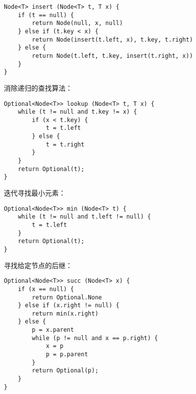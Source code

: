 \documentclass[b5paper]{ctexart}
\begin{document}
\begin{lstlisting}
Node<T> insert (Node<T> t, T x) {
    if (t == null) {
        return Node(null, x, null)
    } else if (t.key < x) {
        return Node(insert(t.left, x), t.key, t.right)
    } else {
        return Node(t.left, t.key, insert(t.right, x))
    }
}
\end{lstlisting}

消除递归的查找算法：

\begin{lstlisting}
Optional<Node<T>> lookup (Node<T> t, T x) {
    while (t != null and t.key != x) {
        if (x < t.key) {
            t = t.left
        } else {
            t = t.right
        }
    }
    return Optional(t);
}
\end{lstlisting}

迭代寻找最小元素：

\begin{lstlisting}
Optional<Node<T>> min (Node<T> t) {
    while (t != null and t.left != null) {
        t = t.left
    }
    return Optional(t);
}
\end{lstlisting}

寻找给定节点的后继：

\begin{lstlisting}
Optional<Node<T>> succ (Node<T> x) {
    if (x == null) {
        return Optional.None
    } else if (x.right != null) {
        return min(x.right)
    } else {
        p = x.parent
        while (p != null and x == p.right) {
            x = p
            p = p.parent
        }
        return Optional(p);
    }
}
\end{lstlisting}


\end{document}
